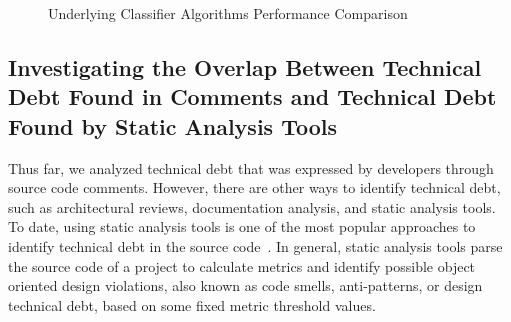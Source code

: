 \clearpage
\begin{figure}[!thb]
  \centering
  \caption{Underlying Classifier Algorithms Performance Comparison}
  \label{chap4:fig:algorithms_comparison}
\end{figure}


\subsection{Investigating the Overlap Between Technical Debt Found in Comments and Technical Debt Found by Static Analysis Tools}
\label{sec:overlap_with_static_analysis_tools}
Thus far, we analyzed technical debt that was expressed by developers through source code comments. However, there are other ways to identify technical debt, such as architectural reviews, documentation analysis, and static analysis tools. To date, using static analysis tools is one of the most popular approaches to identify technical debt in the source code~\cite{Fontana2012MTD}. In general, static analysis tools parse the source code of a project to calculate metrics and identify possible object oriented design violations, also known as code smells, anti-patterns, or design technical debt, based on some fixed metric threshold values. 

